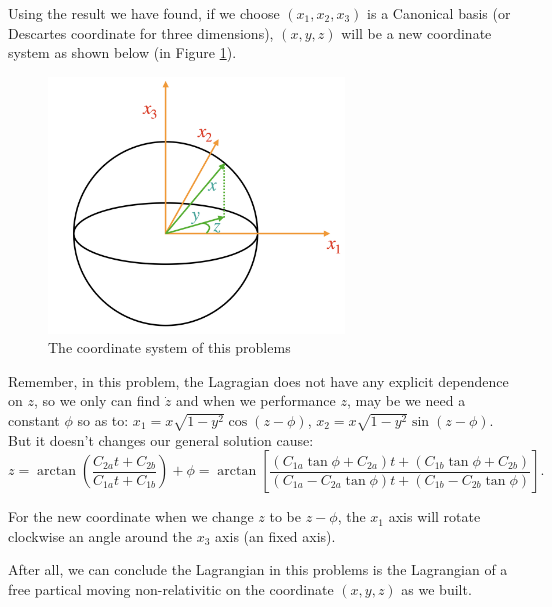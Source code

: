 \documentclass[12pt]{article}
\begin{document}
\newpage

\noindent Using the result we have found, if we choose $(x_1, x_2, x_3)$ is a Canonical basis (or Descartes coordinate for three dimensions), $(x, y, z)$ will be a new coordinate system as shown below (in Figure \ref{Fig P2}).

\begin{figure}[!htb]
	\centering
	\includegraphics[width=0.7\textwidth]{Fig P2.png}
	\caption{The coordinate system of this problems}
	\label{Fig P2}
\end{figure}	

\noindent Remember, in this problem, the Lagragian does not have any explicit dependence on $z$, so we only can find $\dot{z}$ and when we performance $z$, may be we need a constant $\phi$ so as to: $x_1 = x \sqrt{ 1 - y^2 } \cos (z - \phi)$, $x_2 = x \sqrt{ 1 - y^2 } \sin ( z - \phi ) $. But it doesn't changes our general solution cause:
$$ z = \arctan \left( \frac{ C_{2a} t + C_{2b} }{ C_{1a} t + C_{1b} } \right) + \phi = \arctan \left[ \frac{ \left( C_{1a} \tan \phi + C_{2a} \right) t + \left( C_{1b} \tan \phi + C_{2b} \right) }{ \left( C_{1a} - C_{2a} \tan \phi \right) t + \left( C_{1b} - C_{2b} \tan \phi \right) } \right]  .$$

\noindent For the new coordinate when we change $z$ to be $z - \phi$, the $x_1$ axis will rotate clockwise an angle around the $x_3$ axis (an fixed axis).

After all, we can conclude the Lagrangian in this problems is the Lagrangian of a free partical moving non-relativitic on the coordinate $(x, y, z)$ as we built.
\end{document}
